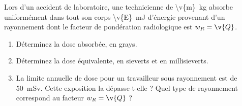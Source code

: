 Lors d'un accident de laboratoire, une technicienne de \qty{\v{m}}{kg} absorbe uniformément dans tout son corps \qty{\v{E}}{mJ} d'énergie provenant d'un rayonnement dont le facteur de pondération radiologique est $w_R = \v{Q}$.

\begin{enumerate}[label=\alph*)]
    \item Déterminez la dose absorbée, en grays.
    \item Déterminez la dose équivalente, en sieverts et en millisieverts.
    \item La limite annuelle de dose pour un travailleur sous rayonnement est de \qty{50}{mSv}. Cette exposition la dépasse-t-elle ? Quel type de rayonnement correspond au facteur $w_R = \v{Q}$ ?
\end{enumerate}
